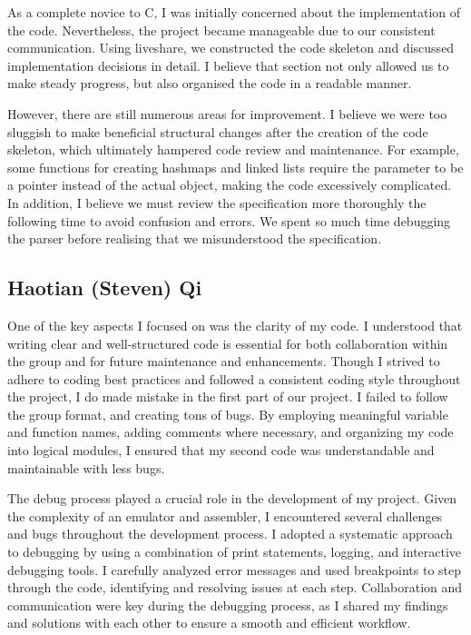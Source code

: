 \documentclass[11pt]{article}
\begin{document}
As a complete novice to C, I was initially concerned about the implementation of the code. Nevertheless, the project became manageable due to our consistent communication. Using liveshare, we constructed the code skeleton and discussed implementation decisions in detail. I believe that section not only allowed us to make steady progress, but also organised the code in a readable manner.

However, there are still numerous areas for improvement. I believe we were too sluggish to make beneficial structural changes after the creation of the code skeleton, which ultimately hampered code review and maintenance. For example, some functions for creating hashmaps and linked lists require the parameter to be a pointer instead of the actual object, making the code excessively complicated. In addition, I believe we must review the specification more thoroughly the following time to avoid confusion and errors. We spent so much time debugging the parser before realising that we misunderstood the specification.

\subsection{Haotian (Steven) Qi}
One of the key aspects I focused on was the clarity of my code. I understood that writing clear and well-structured code is essential for both collaboration within the group and for future maintenance and enhancements.  Though I strived to adhere to coding best practices and followed a consistent coding style throughout the project, I do made mistake in the first part of our project. I failed to follow the group format, and creating tons of bugs. By employing meaningful variable and function names, adding comments where necessary, and organizing my code into logical modules, I ensured that my second code was understandable and maintainable with less bugs.

The debug process played a crucial role in the development of my project. Given the complexity of an emulator and assembler, I encountered several challenges and bugs throughout the development process. I adopted a systematic approach to debugging by using a combination of print statements, logging, and interactive debugging tools. I carefully analyzed error messages and used breakpoints to step through the code, identifying and resolving issues at each step. Collaboration and communication were key during the debugging process, as I shared my findings and solutions with each other to ensure a smooth and efficient workflow.
\end{document}
